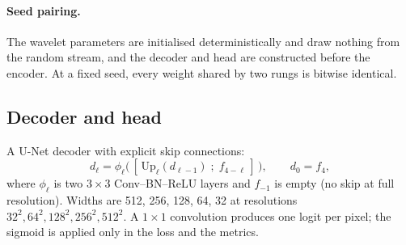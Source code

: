 \documentclass[11pt]{article}
\begin{document}
\paragraph{Seed pairing.} The wavelet parameters are initialised deterministically and draw
nothing from the random stream, and the decoder and head are constructed before the encoder. At a
fixed seed, every weight shared by two rungs is bitwise identical.

\subsection{Decoder and head}

A U-Net decoder \cite{ronneberger2015} with explicit skip connections:
\begin{equation}
  d_\ell = \phi_\ell\big(\,[\,\mathrm{Up}_\ell(d_{\ell-1})\;;\;f_{4-\ell}\,]\,\big),\qquad d_0 = f_4,
\end{equation}
where $\phi_\ell$ is two $3\times3$ Conv--BN--ReLU layers and $f_{-1}$ is empty (no skip at full
resolution). Widths are 512, 256, 128, 64, 32 at resolutions $32^2,64^2,128^2,256^2,512^2$. A
$1\times1$ convolution produces one logit per pixel; the sigmoid is applied only in the loss and
the metrics.
\end{document}
